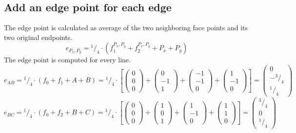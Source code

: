 \documentclass{article}
\newcommand*\rfrac[2]{{}^{#1}\!/_{#2}}%
\begin{document}
\subsection{Add an edge point for each edge}
The edge point is calculated as average of the two neighboring face points and its two original endpoints.
\[e_{P_x,P_y}=\rfrac{1}{4}\cdot(f^{P_x,P_y}_1 + f^{P_x,P_y}_2 + P_x + P_y)\]
The edge point is computed for every line.
\[e_{AB}=\rfrac{1}{4}\cdot(f_0+f_1+A+B)=\rfrac{1}{4}\cdot\left[
\left({\begin{array}{c} 0 \\  0 \\ 0 \end{array}}\right)+
\left({\begin{array}{c} 0 \\ -1 \\ 1 \end{array}}\right)+
\left({\begin{array}{c} -1 \\ -1 \\ 0 \end{array}}\right)+
\left({\begin{array}{c} 1 \\  -1 \\ 0 \end{array}}\right)\right]=
\left({\begin{array}{c} 0 \\ -\rfrac{3}{4} \\ \rfrac{1}{4} \end{array}}\right)
\]
\[e_{BC}=\rfrac{1}{4}\cdot(f_0+f_2+B+C)=\rfrac{1}{4}\cdot\left[
\left({\begin{array}{c} 0 \\  0 \\ 0 \end{array}}\right)+
\left({\begin{array}{c} 1 \\ 0 \\ 1 \end{array}}\right)+
\left({\begin{array}{c} 1 \\ -1 \\ 0 \end{array}}\right)+
\left({\begin{array}{c} 1 \\  1 \\ 0 \end{array}}\right)\right]=
\left({\begin{array}{c} \rfrac{3}{4} \\ 0 \\ \rfrac{1}{4} \end{array}}\right)
\]
\end{document}
